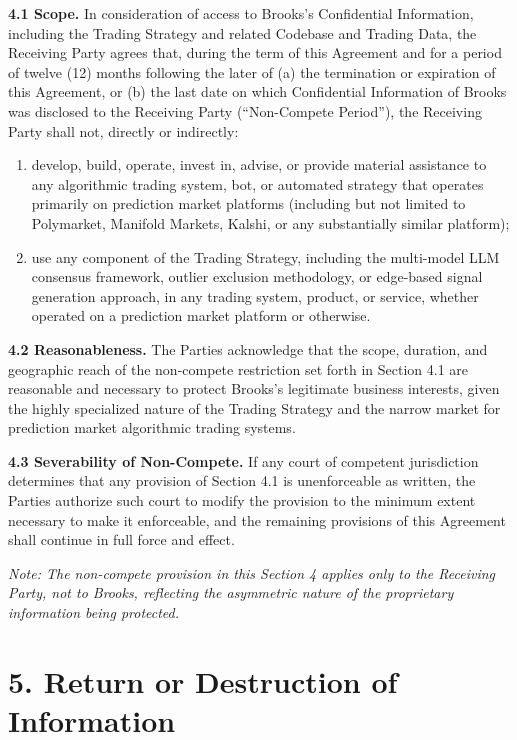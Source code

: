 \documentclass{article}
\begin{document}
\textbf{4.1 Scope.} In consideration of access to Brooks's Confidential Information, including the Trading Strategy and related Codebase and Trading Data, the Receiving Party agrees that, during the term of this Agreement and for a period of twelve (12) months following the later of (a) the termination or expiration of this Agreement, or (b) the last date on which Confidential Information of Brooks was disclosed to the Receiving Party (``Non-Compete Period''), the Receiving Party shall not, directly or indirectly:

\begin{enumerate}[label=(\alph*), leftmargin=2em]
\item develop, build, operate, invest in, advise, or provide material assistance to any algorithmic trading system, bot, or automated strategy that operates primarily on prediction market platforms (including but not limited to Polymarket, Manifold Markets, Kalshi, or any substantially similar platform);

\item use any component of the Trading Strategy, including the multi-model LLM consensus framework, outlier exclusion methodology, or edge-based signal generation approach, in any trading system, product, or service, whether operated on a prediction market platform or otherwise.
\end{enumerate}

\textbf{4.2 Reasonableness.} The Parties acknowledge that the scope, duration, and geographic reach of the non-compete restriction set forth in Section 4.1 are reasonable and necessary to protect Brooks's legitimate business interests, given the highly specialized nature of the Trading Strategy and the narrow market for prediction market algorithmic trading systems.

\textbf{4.3 Severability of Non-Compete.} If any court of competent jurisdiction determines that any provision of Section 4.1 is unenforceable as written, the Parties authorize such court to modify the provision to the minimum extent necessary to make it enforceable, and the remaining provisions of this Agreement shall continue in full force and effect.

\smallskip
\noindent\textit{Note: The non-compete provision in this Section 4 applies only to the Receiving Party, not to Brooks, reflecting the asymmetric nature of the proprietary information being protected.}

\section{5. Return or Destruction of Information}
\end{document}
